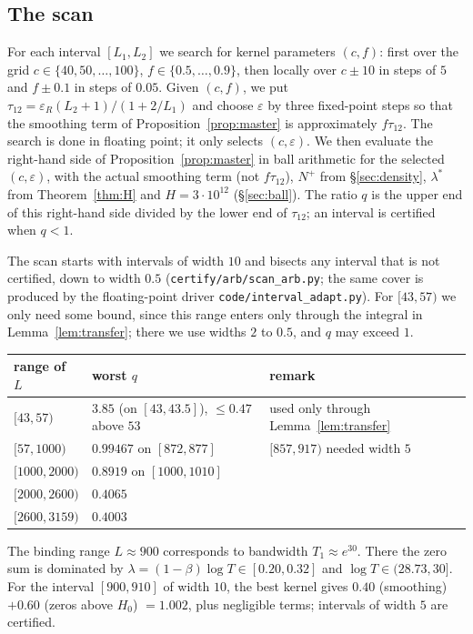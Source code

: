 \documentclass[11pt]{amsart}
\numberwithin{equation}{section}
\theoremstyle{definition}
\theoremstyle{remark}
\newcommand{\eps}{\varepsilon}
\newcommand{\code}[1]{\texttt{#1}}
\begin{document}
\subsection{The scan}
For each interval $[L_1, L_2]$ we search for kernel parameters $(c, f)$:
first over the grid $c\in\{40,50,\dots,100\}$, $f\in\{0.5,\dots,0.9\}$, then locally over $c\pm10$ in steps of $5$ and $f\pm0.1$ in steps of $0.05$.
Given $(c,f)$, we put $\tau_{12} = \eps_R(L_2+1)/(1 + 2/L_1)$ and choose $\eps$ by three fixed-point steps so that the smoothing term of Proposition~\ref{prop:master} is approximately $f\tau_{12}$.
The search is done in floating point; it only selects $(c, \eps)$.
We then evaluate the right-hand side of Proposition~\ref{prop:master} in ball arithmetic for the selected $(c,\eps)$, with the actual smoothing term (not $f\tau_{12}$), $N^+$ from \S\ref{sec:density}, $\lambda^*$ from Theorem~\ref{thm:H} and $H = 3\cdot10^{12}$ (\S\ref{sec:ball}).
The ratio $q$ is the upper end of this right-hand side divided by the lower end of $\tau_{12}$; an interval is certified when $q < 1$.

The scan starts with intervals of width $10$ and bisects any interval that is not certified, down to width $0.5$ (\code{certify/arb/scan\_arb.py}; the same cover is produced by the floating-point driver \code{code/interval\_adapt.py}).
For $[43, 57)$ we only need some bound, since this range enters only through the integral in Lemma~\ref{lem:transfer}; there we use widths $2$ to $0.5$, and $q$ may exceed $1$.

\begin{center}
\begin{tabular}{lll}
\toprule
range of $L$ & worst $q$ & remark\\
\midrule
$[43,57)$ & $3.85$ (on $[43,43.5]$), $\le 0.47$ above $53$ & used only through Lemma~\ref{lem:transfer}\\
$[57,1000)$ & $0.99467$ on $[872,877]$ & $[857,917)$ needed width $5$\\
$[1000,2000)$ & $0.8919$ on $[1000,1010]$ & \\
$[2000,2600)$ & $0.4065$ & \\
$[2600,3159)$ & $0.4003$ & \\
\bottomrule
\end{tabular}
\end{center}

The binding range $L\approx 900$ corresponds to bandwidth $T_1 \approx e^{30}$.
There the zero sum is dominated by $\lambda = (1-\beta)\log T \in [0.20, 0.32]$ and $\log T\in(28.73, 30]$.
For the interval $[900,910]$ of width $10$, the best kernel gives $0.40$ (smoothing) $+ 0.60$ (zeros above $H_0$) $= 1.002$, plus negligible terms; intervals of width $5$ are certified.
\end{document}
